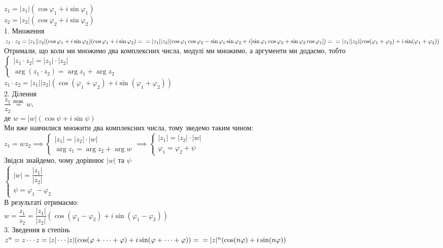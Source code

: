 \documentclass[a4paper, 14pt]{extarticle}
\def\bigline{\vspace{5mm}\\}
\theoremstyle{theoremdd}
\theoremstyle{theoremdd}
\theoremstyle{theoremdd}
\theoremstyle{theoremdd}
\theoremstyle{theoremdd}
\theoremstyle{theoremdd}
\theoremstyle{theoremdd}
\theoremstyle{theoremdd}
\begin{document}
$z_1 = |z_1| (\cos \varphi_1 + i \sin \varphi_1)$\\
$z_2 = |z_2| (\cos \varphi_2 + i \sin \varphi_2)$
\bigline
1. Множення\\
$z_1 \cdot z_2 = |z_1| |z_2| (\cos \varphi_1 + i \sin \varphi_2) (\cos \varphi_1 + i \sin \varphi_2) = \\ = |z_1| |z_2| (\cos \varphi_1 \cos \varphi_2 - \sin \varphi_1 \sin \varphi_2 + i[\sin \varphi_1 \cos \varphi_2 + \sin \varphi_2 \cos \varphi_1]) = \\
= |z_1||z_2|(\cos (\varphi_1 + \varphi_2) + i \sin(\varphi_1 + \varphi_2))$\\
Отримали, що коли ми множимо два комплексних числа, модулі ми множимо, а аргументи ми додаємо, тобто\\
$\begin{cases}
|z_1 \cdot z_2| = |z_1| \cdot |z_2| \\
\arg(z_1 \cdot z_2) = \arg z_1 + \arg z_2
\end{cases}$\\
$z_1 \cdot z_2 = |z_1||z_2|(\cos (\varphi_1 + \varphi_2) + i \sin(\varphi_1 + \varphi_2))$
\bigline
2. Ділення\\
$\dfrac{z_1}{z_2} \overset{\textrm{позн.}}{=} w$,\\
де $w = |w|(\cos \psi + i \sin \psi)$\\
Ми вже навчилися множити два комплексних числа, тому зведемо таким чином:\\
$z_1 = w z_2 \implies \begin{cases} |z_1| = |z_2| \cdot |w| \\ \arg z_1 = \arg z_2 + \arg w \end{cases} \implies \begin{cases} |z_1| = |z_2| \cdot |w| \\ \varphi_1 = \varphi_2 + \psi \end{cases}$\\
Звідси знайдемо, чому дорівнює $|w|$ та $\psi$\\
$\begin{cases} |w| = \dfrac{|z_1|}{|z_2|} \\ \psi = \varphi_1 - \varphi_2 \end{cases}$\\
В результаті отримаємо:\\
$w = \dfrac{z_1}{z_2} = \dfrac{|z_1|}{|z_2|} (\cos (\varphi_1 - \varphi_2) + i \sin (\varphi_1 - \varphi_2))$
\bigline
3. Зведення в степінь\\
$z^n = z \cdots z = |z| \cdots |z| (\cos(\varphi+\dots+\varphi) + i \sin (\varphi + \dots + \varphi)) = \\ = |z|^n (\cos (n \varphi) + i \sin (n \varphi))$\\
\end{document}
